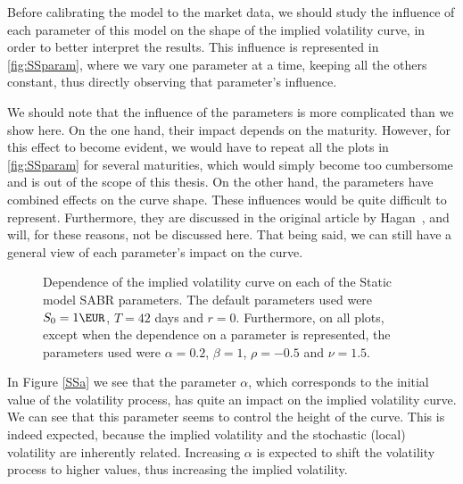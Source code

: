 Before calibrating the model to the market data, we should study the influence of each parameter of this model on the shape of the implied volatility curve, in order to better interpret the results. This influence is represented in \autoref{fig:SSparam}, where we vary one parameter at a time, keeping all the others constant, thus directly observing that parameter's influence.


We should note that the influence of the parameters is more complicated than we show here. On the one hand, their impact depends on the maturity. However, for this effect to become evident, we would have to repeat all the plots in \autoref{fig:SSparam} for several maturities, which would simply become too cumbersome and is out of the scope of this thesis.
On the other hand, the parameters have combined effects on the curve shape. These influences would be quite difficult to represent. Furthermore, they are discussed in the original article by Hagan~\citep{Hagan}, and will, for these reasons, not be discussed here.
That being said, we can still have a general view of each parameter's impact on the curve.

\vspace{\fill}
\newpage

\begin{figure}[H]
  \begin{subfigmatrix}{2}
  \end{subfigmatrix}
  \caption[Dependence of the implied volatility curve on each of the Static SABR model parameters.]{Dependence of the implied volatility curve on each of the Static model SABR parameters. The default parameters used were $S_0=1\EUR$, $T=42$ days and $r=0$. Furthermore, on all plots, except when the dependence on a parameter is represented, the parameters used were $\alpha=0.2$, $\beta=1$, $\rho=-0.5$ and $\nu=1.5$.}
  \label{fig:SSparam}
\end{figure}

In Figure \autoref{SSa} we see that the parameter $\alpha$, which corresponds to the initial value of the volatility process, has quite an impact on the implied volatility curve. We can see that this parameter seems to control the height of the curve. This is indeed expected, because the implied volatility and the stochastic (local) volatility are inherently related. Increasing $\alpha$ is expected to shift the volatility process to higher values, thus increasing the implied volatility.

